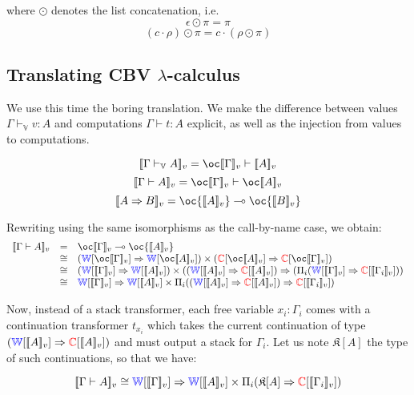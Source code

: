 \documentclass[a4paper]{article}
\newcommand{\interp}[1]{[\![ #1 ]\!]}
\newcommand{\wproof}[1]{{\color{blue}\mathbb{W}}[#1]}
\newcommand{\cproof}[1]{{\color{red}\mathbb{C}}[#1]}
\begin{document}
\noindent where $\odot$ denotes the list concatenation, i.e.
$$\epsilon \odot \pi = \pi$$
$$(c \cdot \rho)\odot \pi = c \cdot (\rho \odot \pi)$$

\subsection{Translating CBV $\lambda$-calculus}

We use this time the boring translation. We make the difference between values 
$\Gamma \vdash_\mathbb{V} v : A$ and computations $\Gamma \vdash t : A$ 
explicit, as well as the injection from values to computations.

$$\interp{\Gamma\vdash_{\mathbb{V}} A}_v = 
\oc\interp{\Gamma}_v\vdash\interp{A}_v$$
$$\interp{\Gamma \vdash A}_v = \oc\interp{\Gamma}_v \vdash \oc\interp{A}_v$$
$$\interp{A \Rightarrow B}_v = \oc{\interp{A}_v} \multimap \oc{\interp{B}_v}$$

Rewriting using the same isomorphisms as the call-by-name case, we obtain:
$$\begin{array}{lcl}
  \interp{\Gamma\vdash A}_v
  &=& {\oc\interp{\Gamma}_v} \multimap \oc{\interp{A}_v}\\

  &\cong& (\wproof{\oc\interp{\Gamma}_v} \Rightarrow \wproof{\oc\interp{A}_v})
  \times (\cproof{\oc\interp{A}_v} \Rightarrow \cproof{\oc\interp{\Gamma}_v})\\

  &\cong& (\wproof{\interp{\Gamma}_v} \Rightarrow \wproof{\interp{A}_v})
  \times ((\wproof{\interp{A}_v} \Rightarrow \cproof{\interp{A}_v}) \Rightarrow
  (\Pi_i (\wproof{\interp{\Gamma}_v}
    \Rightarrow \cproof{\interp{\Gamma_i}_v}))\\

  &\cong& \wproof{\interp{\Gamma}_v} \Rightarrow
    \wproof{\interp{A}_v} \times \Pi_i
    ((\wproof{\interp{A}_v} \Rightarrow \cproof{\interp{A}_v})
      \Rightarrow \cproof{\interp{\Gamma_i}_v})
\end{array}$$

\newcommand{\kont}[1]{\mathfrak{K}[#1]}

Now, instead of a stack transformer, each free variable $x_i : \Gamma_i$ comes
with a continuation transformer $t_{x_i}$ which takes the current continuation 
of type $(\wproof{\interp{A}_v} \Rightarrow \cproof{\interp{A}_v})$ and must 
output a stack for $\Gamma_i$. Let us note $\kont{A}$ the type of such
continuations, so that we have:

$$
  \interp{\Gamma\vdash A}_v \cong \wproof{\interp{\Gamma}_v} \Rightarrow
    \wproof{\interp{A}_v} \times \Pi_i
    (\kont{A} \Rightarrow \cproof{\interp{\Gamma_i}_v})\\
$$
\end{document}
